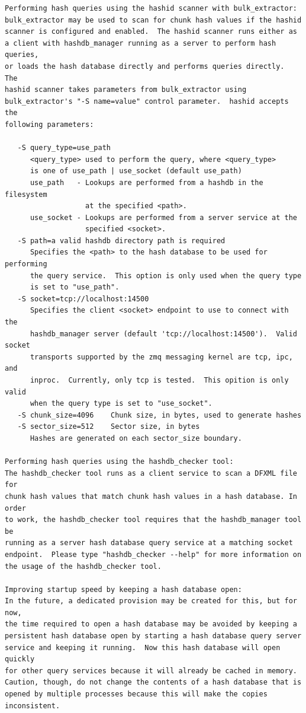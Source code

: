 \documentclass[11pt,twoside]{article}
\begin{document}
\begin{small}
\begin{verbatim}
Performing hash queries using the hashid scanner with bulk_extractor:
bulk_extractor may be used to scan for chunk hash values if the hashid
scanner is configured and enabled.  The hashid scanner runs either as
a client with hashdb_manager running as a server to perform hash queries,
or loads the hash database directly and performs queries directly.  The
hashid scanner takes parameters from bulk_extractor using
bulk_extractor's "-S name=value" control parameter.  hashid accepts the
following parameters:

   -S query_type=use_path
      <query_type> used to perform the query, where <query_type>
      is one of use_path | use_socket (default use_path)
      use_path   - Lookups are performed from a hashdb in the filesystem
                   at the specified <path>.
      use_socket - Lookups are performed from a server service at the
                   specified <socket>.
   -S path=a valid hashdb directory path is required
      Specifies the <path> to the hash database to be used for performing
      the query service.  This option is only used when the query type
      is set to "use_path".
   -S socket=tcp://localhost:14500
      Specifies the client <socket> endpoint to use to connect with the
      hashdb_manager server (default 'tcp://localhost:14500').  Valid socket
      transports supported by the zmq messaging kernel are tcp, ipc, and
      inproc.  Currently, only tcp is tested.  This opition is only valid
      when the query type is set to "use_socket".
   -S chunk_size=4096    Chunk size, in bytes, used to generate hashes
   -S sector_size=512    Sector size, in bytes
      Hashes are generated on each sector_size boundary.

Performing hash queries using the hashdb_checker tool:
The hashdb_checker tool runs as a client service to scan a DFXML file for
chunk hash values that match chunk hash values in a hash database. In order
to work, the hashdb_checker tool requires that the hashdb_manager tool be
running as a server hash database query service at a matching socket
endpoint.  Please type "hashdb_checker --help" for more information on
the usage of the hashdb_checker tool.

Improving startup speed by keeping a hash database open:
In the future, a dedicated provision may be created for this, but for now,
the time required to open a hash database may be avoided by keeping a
persistent hash database open by starting a hash database query server
service and keeping it running.  Now this hash database will open quickly
for other query services because it will already be cached in memory.
Caution, though, do not change the contents of a hash database that is
opened by multiple processes because this will make the copies inconsistent.


\end{verbatim}
\end{small}
\end{document}
